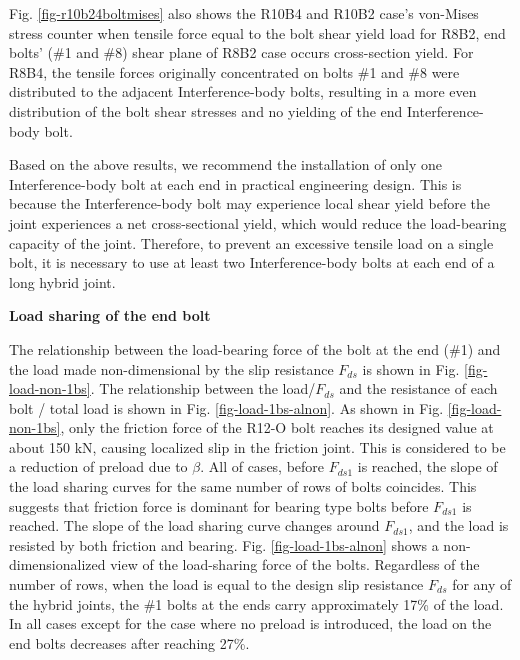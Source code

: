Fig. \ref{fig-r10b24boltmises} also shows the R10B4 and R10B2 case's von-Mises stress counter when tensile force equal to the bolt shear yield load for R8B2, end bolts' (\#1 and \#8) shear plane of R8B2 case occurs cross-section yield. For R8B4, the tensile forces originally concentrated on bolts \#1 and \#8 were distributed to the adjacent Interference-body bolts, resulting in a more even distribution of the bolt shear stresses and no yielding of the end Interference-body bolt.

Based on the above results, we recommend the installation of only one Interference-body bolt at each end in practical engineering design. This is because the Interference-body bolt may experience local shear yield before the joint experiences a net cross-sectional yield, which would reduce the load-bearing capacity of the joint. Therefore, to prevent an excessive tensile load on a single bolt, it is necessary to use at least two Interference-body bolts at each end of a long hybrid joint.

\textbf{Load sharing of the end bolt}

The relationship between the load-bearing force of the bolt at the end (\#1) and the load made non-dimensional by the slip resistance $F_{ds}$ is shown in Fig. \ref{fig-load-non-1bs}. The relationship between the load/$F_{ds}$ and the resistance of each bolt / total load is shown in Fig. \ref{fig-load-1bs-alnon}. As shown in Fig. \ref{fig-load-non-1bs}, only the friction force of the R12-O bolt reaches its designed value at about 150 kN, causing localized slip in the friction joint. This is considered to be a reduction of preload due to $\beta$. All of cases, before $F_{ds1}$ is reached, the slope of the load sharing curves for the same number of rows of bolts coincides. This suggests that friction force is dominant for bearing type bolts before $F_{ds1}$ is reached. The slope of the load sharing curve changes around $F_{ds1}$, and the load is resisted by both friction and bearing. Fig. \ref{fig-load-1bs-alnon} shows a non-dimensionalized view of the load-sharing force of the bolts. Regardless of the number of rows, when the load is equal to the design slip resistance $F_{ds}$ for any of the hybrid joints, the \#1 bolts at the ends carry approximately 17\% of the load. In all cases except for the case where no preload is introduced, the load on the end bolts decreases after reaching 27\%.

